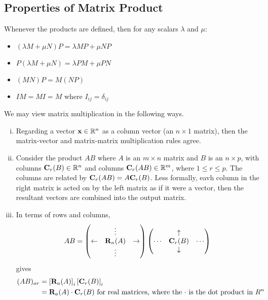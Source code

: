 \documentclass{article}
\begin{document}
\subsection{Properties of Matrix Product}
Whenever the products are defined, then for any scalars $\lambda$ and $\mu$:
\begin{itemize}
	\item $(\lambda M + \mu N)P = \lambda MP + \mu NP$
	\item $P(\lambda M + \mu N) = \lambda PM + \mu PN$
	\item $(MN)P = M(NP)$
	\item $IM = MI = M$ where $I_{ij} = \delta_{ij}$
\end{itemize}
We may view matrix multiplication in the following ways.
\begin{enumerate}[(i)]
	\item Regarding a vector $\vb x \in \mathbb R^n$ as a column vector (an $n \times 1$ matrix), then the matrix-vector and matrix-matrix multiplication rules agree.
	\item Consider the product $AB$ where $A$ is an $m \times n$ matrix and $B$ is an $n \times p$, with columns $\vb C_r(B) \in \mathbb R^n$ and columns $\vb C_r(AB) \in \mathbb R^m$, where $1 \leq r \leq p$. The columns are related by $\vb C_r(AB) = A \vb C_r(B)$. Less formally, eavh column in the right matrix is acted on by the left matrix as if it were a vector, then the resultant vectors are combined into the output matrix.
	\item In terms of rows and columns,
	      \[ AB = \begin{pmatrix}
			                 & \vdots     &             \\
			      \leftarrow & \vb R_n(A) & \rightarrow \\
			                 & \vdots     &
		      \end{pmatrix} \begin{pmatrix}
			             & \uparrow   &        \\
			      \cdots & \vb C_r(B) & \cdots \\
			             & \downarrow &
		      \end{pmatrix} \]
	      gives
	      \begin{align*}
		      (AB)_{ar} & = \left[ \vb R_a(A) \right]_i \left[ \vb C_r(B) \right]_i                                              \\
		                & = \vb R_a(A) \cdot \vb C_r(B) \text{ for real matrices, where the $\cdot$ is the dot product in $R^n$}
	      \end{align*}
\end{enumerate}
\end{document}
